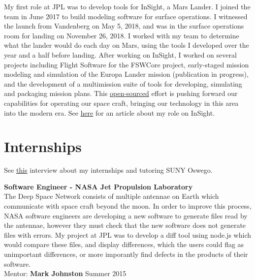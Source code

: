 \documentclass[8pt]{article}
\renewenvironment{itemize}{
  \begin{list}{}{
    \setlength{\leftmargin}{1.5em}
  }
}{
  \end{list}
}
\begin{document}
My first role at JPL was to develop tools for InSight, a Mars Lander. I joined the team in June 2017 to build modeling software for surface operations. I witnessed the launch from Vandenberg on May 5, 2018, and was in the surface operations room for landing on November 26, 2018. I worked with my team to determine what the lander would do each day on Mars, using the tools I developed over the year and a half before landing. After working on InSight, I worked on several projects including Flight Software for the FSWCore project, early-staged mission modeling and simulation of the Europa Lander mission (publication in progress), and the development of a multimission suite of tools for developing, simulating and packaging mission plans. This \href{https://github.com/NASA-AMMOS/aerie}{open-sourced} effort is pushing forward our capabilities for operating our space craft, bringing our technology in this area into the modern era. See \href{http://www.oswegocountynewsnow.com/news/mars-landing-puts-phoenix-native-suny-oswego-grad-roffo-among/article_968bd574-f34c-11e8-8c5b-b7d557e9f682.html?fbclid=IwAR1iCW3CdQIRr2JIy1f96utXjzzidSJ6vA13jVgvkjKIU6PopaLHYkpbQrw}{here} for an article about my role on InSight.


\section*{Internships} See \href{https://www.youtube.com/watch?v=BiJOjhm_ov4}{this} interview about my internships and tutoring SUNY Oswego.
\begin{itemize}
\item \textbf{Software Engineer - NASA Jet Propulsion Laboratory}\\
  The Deep Space Network consists of multiple antennae on Earth which communicate with space craft beyond the moon. In order to improve this process, NASA software engineers are developing a new software to generate files read by the antennae, however they must check that the new software does not generate files with errors. My project at JPL was to develop a diff tool using node.js which would compare these files, and display differences, which the users could flag as unimportant differences, or more imporantly find defects in the products of their software.\\
  Mentor: \textbf{Mark Johnston} \hfill Summer 2015


\end{itemize}
\end{document}
